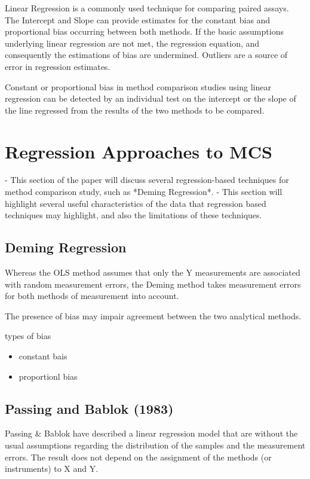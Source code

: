 \documentclass[MAIN.tex]{subfiles}
\begin{document}
Linear Regression is a commonly used technique for comparing paired assays. The Intercept and Slope can provide estimates for the constant bias and proportional bias occurring between both methods. If the basic assumptions underlying linear regression are not met, the regression equation, and consequently the estimations
of bias are undermined. Outliers are a source of error in regression estimates.

Constant or proportional bias in method comparison studies using linear regression can be detected by an individual test on the intercept or the slope of the line regressed from the results of the two methods to be compared.







\section{Regression Approaches to MCS}
- This section of the paper will discuss several regression-based techniques for method comparison study, 
such as *Deming Regression*. 
- This section will highlight several useful characteristics of the data that 
regression based techniques may highlight, and also the limitations of these techniques.

\subsection*{ Deming Regression}
Whereas the OLS method assumes that only the Y measurements are associated with 
random measurement errors, the Deming method takes measurement errors for both methods of measurement into account.




The presence of bias may impair agreement between the two analytical methods.

types of bias

\begin{itemize}
	\item constant bais
	\item proportionl bias
\end{itemize}

\subsection{Passing and Bablok (1983) }
Passing \& Bablok have described a linear regression model that are without the usual assumptions regarding the distribution of
the samples and the measurement errors. The result does not depend on the assignment of the methods (or instruments) to X and Y.
\end{document}
